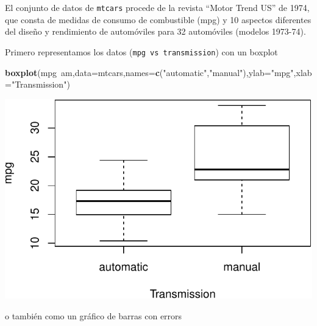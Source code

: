 \documentclass[]{article}
\newenvironment{Shaded}{\begin{snugshade}}{\end{snugshade}}
\newcommand{\KeywordTok}[1]{\textcolor[rgb]{0.13,0.29,0.53}{\textbf{{#1}}}}
\newcommand{\DataTypeTok}[1]{\textcolor[rgb]{0.13,0.29,0.53}{{#1}}}
\newcommand{\StringTok}[1]{\textcolor[rgb]{0.31,0.60,0.02}{{#1}}}
\newcommand{\NormalTok}[1]{{#1}}
\numberwithin{equation}{section}
\begin{document}
El conjunto de datos de \texttt{mtcars} procede de la revista ``Motor
Trend US'' de 1974, que consta de medidas de consumo de combustible
(mpg) y 10 aspectos diferentes del diseño y rendimiento de automóviles
para 32 automóviles (modelos 1973-74).

Primero representamos los datos (\texttt{mpg\ vs\ transmission}) con un
boxplot

\begin{Shaded}
\begin{Highlighting}[]
\KeywordTok{boxplot}\NormalTok{(mpg~am,}\DataTypeTok{data=}\NormalTok{mtcars,}\DataTypeTok{names=}\KeywordTok{c}\NormalTok{(}\StringTok{"automatic"}\NormalTok{,}\StringTok{"manual"}\NormalTok{),}\DataTypeTok{ylab=}\StringTok{"mpg"}\NormalTok{,}\DataTypeTok{xlab=}\StringTok{"Transmission"}\NormalTok{)}
\end{Highlighting}
\end{Shaded}

\includegraphics{tema5_files/figure-latex/unnamed-chunk-21-1.pdf}

o también como un gráfico de barras con errors
\end{document}
